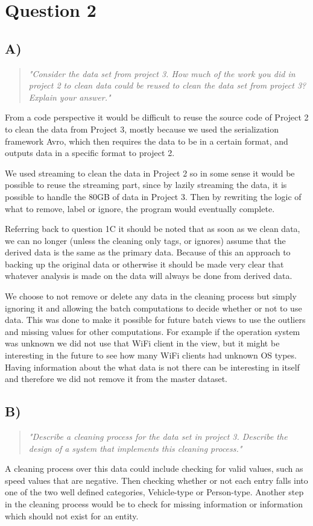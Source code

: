 \section{Question 2}

\subsection{A)}
\begin{quote}
	\textit{"Consider	the	data	set	from	project	3.	How	much	of	the	work	you	did	in	project	2	to	clean	data	could	be	reused	to	clean	the	data	set	from	project	3?	Explain	your	answer."}
\end{quote}
From a code perspective it would be difficult to reuse the source code of Project 2 to clean the data from Project 3, mostly because we used the serialization framework Avro, which then requires the data to be in a certain format, and outputs data in a specific format to project 2.

\newpar We used streaming to clean the data in Project 2 so in some sense it would be possible to reuse the streaming part, since by lazily streaming the data, it is possible to handle the 80GB of data in Project 3. Then by rewriting the logic of what to remove, label or ignore, the program would eventually complete.

\newpar Referring back to question 1C it should be noted that as soon as we clean data, we can no longer (unless the cleaning only tags, or ignores) assume that the derived data is the same as the primary data. Because of this an approach to backing up the original data or otherwise it should be made very clear that whatever analysis is made on the data will always be done from derived data.

\newpar We choose to not remove or delete any data in the cleaning process but simply ignoring it and allowing the batch computations to decide whether or not to use data. This was done to make it possible for future batch views to use the outliers and missing values for other computations. For example if the operation system was unknown we did not use that WiFi client in the view, but it might be interesting in the future to see how many WiFi clients had unknown OS types. Having information about the what data is not there can be interesting in itself and therefore we did not remove it from the master dataset. 

\subsection{B)}
\begin{quote}
	\textit{"Describe	a	cleaning	process	for	the	data	set	in	project	3.	Describe	the	design	of	a	system	that	implements	this	cleaning	process."}
\end{quote}
A cleaning process over this data could include checking for valid values, such as speed values that are negative. Then checking whether or not each entry falls into one of the two well defined categories, Vehicle-type or Person-type. Another step in the cleaning process would be to check for missing information or information which should not exist for an entity.

